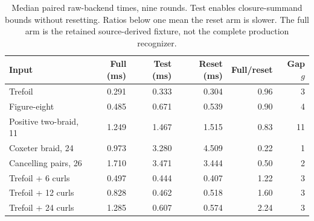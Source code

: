 \begin{table}[htbp]
\centering\small
\begin{tabular}{@{}lrrrrr@{}}
\toprule
Input & Full (ms) & Test (ms) & Reset (ms) & Full/reset & Gap $g$\\
\midrule
Trefoil & 0.291 & 0.333 & 0.304 & 0.96 & 3\\
Figure-eight & 0.485 & 0.671 & 0.539 & 0.90 & 4\\
Positive two-braid, 11 & 1.249 & 1.467 & 1.515 & 0.83 & 11\\
Coxeter braid, 24 & 0.973 & 3.280 & 4.509 & 0.22 & 1\\
Cancelling pairs, 26 & 1.710 & 3.471 & 3.444 & 0.50 & 2\\
Trefoil + 6 curls & 0.497 & 0.444 & 0.407 & 1.22 & 3\\
Trefoil + 12 curls & 0.828 & 0.462 & 0.518 & 1.60 & 3\\
Trefoil + 24 curls & 1.285 & 0.607 & 0.574 & 2.24 & 3\\
\bottomrule
\end{tabular}
\caption{Median paired raw-backend times, nine rounds. Test enables closure-summand bounds without resetting. Ratios below one mean the reset arm is slower. The full arm is the retained source-derived fixture, not the complete production recognizer.}
\label{tab:benchmark}
\end{table}
